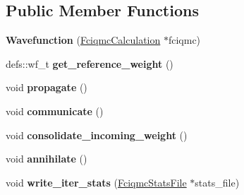 \subsection*{Public Member Functions}
\begin{DoxyCompactItemize}
\item 
{\bfseries Wavefunction} (\hyperlink{classFciqmcCalculation}{Fciqmc\+Calculation} $\ast$fciqmc)\hypertarget{classWavefunction_a3366527332e758ccb9717a185d3861dc}{}\label{classWavefunction_a3366527332e758ccb9717a185d3861dc}

\item 
defs\+::wf\+\_\+t {\bfseries get\+\_\+reference\+\_\+weight} ()\hypertarget{classWavefunction_ab1e27036aa5e04ebc5c1fe8298dabe4d}{}\label{classWavefunction_ab1e27036aa5e04ebc5c1fe8298dabe4d}

\item 
void {\bfseries propagate} ()\hypertarget{classWavefunction_ab0b4bde2e3c3f58048b79508f06ed5aa}{}\label{classWavefunction_ab0b4bde2e3c3f58048b79508f06ed5aa}

\item 
void {\bfseries communicate} ()\hypertarget{classWavefunction_a5844af9aae578689f8e854e21e694b3b}{}\label{classWavefunction_a5844af9aae578689f8e854e21e694b3b}

\item 
void {\bfseries consolidate\+\_\+incoming\+\_\+weight} ()\hypertarget{classWavefunction_af63659ee2a28223bcc0848b550ffeecd}{}\label{classWavefunction_af63659ee2a28223bcc0848b550ffeecd}

\item 
void {\bfseries annihilate} ()\hypertarget{classWavefunction_ac295a3b53f122eeb04104c3561870820}{}\label{classWavefunction_ac295a3b53f122eeb04104c3561870820}

\item 
void {\bfseries write\+\_\+iter\+\_\+stats} (\hyperlink{structFciqmcStatsFile}{Fciqmc\+Stats\+File} $\ast$stats\+\_\+file)\hypertarget{classWavefunction_ade73eb2f93b8511afcfc7c2fc4fe93d0}{}\label{classWavefunction_ade73eb2f93b8511afcfc7c2fc4fe93d0}

\end{DoxyCompactItemize}
